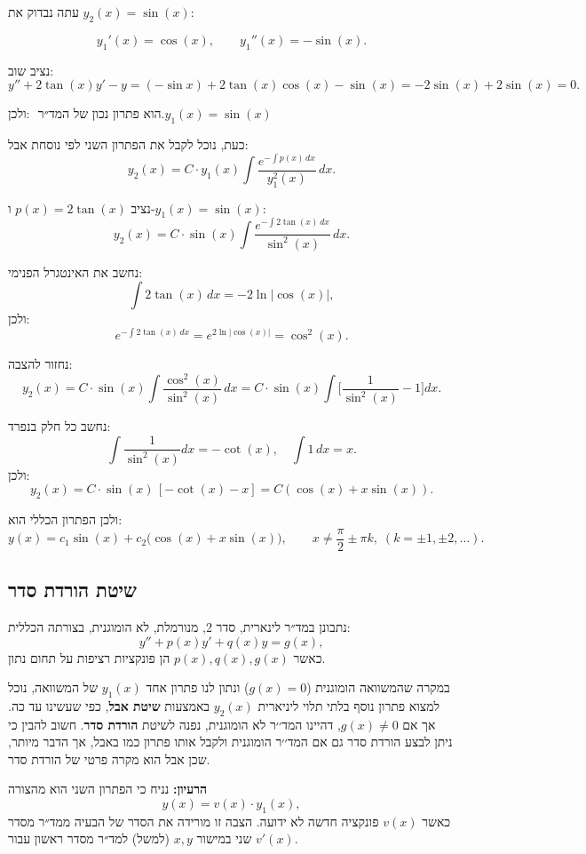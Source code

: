 \documentclass{article}
\numberwithin{equation}{section}
\begin{document}
עתה נבדוק את \(y_2(x) = \sin(x)\):

\[
y_1'(x) = \cos(x), \qquad y_1''(x) = -\sin(x).
\]

נציב שוב:
\[
y'' + 2\tan(x)y' - y = (-\sin x) + 2\tan(x)\cos(x) - \sin(x)
= -2\sin(x) + 2\sin(x) = 0.
\]

ולכן:
\(\text{ הוא פתרון נכון של המד״ר.}{y_1(x) = \sin(x)} 
\)

כעת, נוכל לקבל את הפתרון השני לפי נוסחת אבל:
\[
y_2(x) = C \cdot y_1(x) \int \frac{e^{-\int p(x)\,dx}}{y_1^2(x)}\,dx.
\]

נציב \(p(x) = 2\tan(x)\) ו-\(y_1(x)=\sin(x)\):
\[
y_2(x) = C \cdot \sin(x) \int \frac{e^{-\int 2\tan(x)\,dx}}{\sin^2(x)}\,dx.
\]

נחשב את האינטגרל הפנימי:
\[
\int 2\tan(x)\,dx = -2\ln|\cos(x)|,
\]
ולכן:
\[
e^{-\int 2\tan(x)\,dx} = e^{2\ln|\cos(x)|} = \cos^2(x).
\]

נחזור להצבה:
\[
y_2(x) = C \cdot \sin(x) \int \frac{\cos^2(x)}{\sin^2(x)}\,dx 
= C \cdot \sin(x) \int \bigg[\frac{1}{\sin^2(x)} - 1\bigg] dx.
\]

נחשב כל חלק בנפרד:
\[
\int \frac{1}{\sin^2(x)}dx = -\cot(x), \quad \int 1\,dx = x.
\]
ולכן:
\[
y_2(x) = C \cdot \sin(x)\,[ -\cot(x) - x ] = C(\cos(x) + x\sin(x)).
\]

ולכן הפתרון הכללי הוא:
\[
\boxed{y(x) = c_1\sin(x) + c_2\big(\cos(x) + x\sin(x)\big)}, \qquad x \neq \frac{\pi}{2} \pm \pi k, \; (k = \pm1, \pm2, \dots).
\]

\newpage
\subsection{ שיטת הורדת סדר}

נתבונן במד״ר לינארית, סדר 2, מנורמלת, לא הומוגנית, בצורתה הכללית:
\begin{equation}
y'' + p(x)y' + q(x)y = g(x),
\end{equation}
כאשר $p(x),q(x),g(x)$ הן פונקציות רציפות על תחום נתון.

במקרה שהמשוואה הומוגנית ($g(x)=0$) ונתון לנו פתרון אחד $y_1(x)$ של המשוואה, נוכל למצוא פתרון נוסף בלתי תלוי ליניארית $y_2(x)$ באמצעות \textbf{שיטת אבל}, כפי שעשינו עד כה. אך אם $g(x)\neq0$, דהיינו המד׳׳ר לא הומוגנית, נפנה לשיטת \textbf{הורדת סדר}. חשוב להבין כי ניתן לבצע הורדת סדר גם אם המד׳׳ר הומוגנית ולקבל אותו פתרון כמו באבל, אך הדבר מיותר, שכן אבל הוא מקרה פרטי של הורדת סדר.

\textbf{הרעיון:}
נניח כי הפתרון השני הוא מהצורה
\begin{equation}
y(x) = v(x)\cdot y_1(x),
\end{equation}
כאשר $v(x)$ פונקציה חדשה לא ידועה. הצבה זו מורידה את הסדר של הבעיה ממד״ר מסדר שני במישור $x,y$ (למשל) למד״ר מסדר ראשון עבור $v'(x)$.
\end{document}

